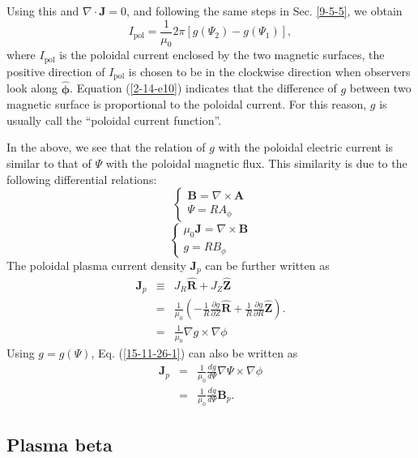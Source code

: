 \documentclass{llncs}
\newcommand{\tmmathbf}[1]{\ensuremath{\boldsymbol{#1}}}
\newcommand{\tmop}[1]{\ensuremath{\operatorname{#1}}}
\begin{document}
Using this and $\nabla \cdot \mathbf{J}= 0$, and following the same steps in
Sec. \ref{9-5-5}, we obtain
\begin{equation}
  \label{2-14-e10} I_{\tmop{pol}} = \frac{1}{\mu_0} 2 \pi [g (\Psi_2) - g
  (\Psi_1)],
\end{equation}
where $I_{\tmop{pol}}$ is the poloidal current enclosed by the two magnetic
surfaces, the positive direction of $I_{\tmop{pol}}$ is chosen to be in the
clockwise direction when observers look along $\hat{\tmmathbf{\phi}}$.
Equation (\ref{2-14-e10}) indicates that the difference of $g$ between two
magnetic surface is proportional to the poloidal current. For this reason, $g$
is usually call the ``poloidal current function''.

In the above, we see that the relation of $g$ with the poloidal electric
current is similar to that of $\Psi$ with the poloidal magnetic flux. This
similarity is due to the following differential relations:
\[ \left\{ \begin{array}{l}
     \mathbf{B}= \nabla \times \mathbf{A}\\
     \Psi = R A_{\phi}
   \end{array} \right. \]
\[ \left\{ \begin{array}{l}
     \mu_0 \mathbf{J}= \nabla \times \mathbf{B}\\
     g = R B_{\phi}
   \end{array} \right. \]
The poloidal plasma current density $\mathbf{J}_p$ can be further written as
\begin{eqnarray}
  \mathbf{J}_p & \equiv & J_R \hat{\mathbf{R}} + J_Z \hat{\mathbf{Z}}
  \nonumber\\
  & = & \frac{1}{\mu_0} \left( - \frac{1}{R}  \frac{\partial g}{\partial Z}
  \hat{\mathbf{R}} + \frac{1}{R} \frac{\partial g}{\partial R}
  \hat{\mathbf{Z}} \right) . \nonumber\\
  & = & \frac{1}{\mu_0} \nabla g \times \nabla \phi  \label{15-11-26-1}
\end{eqnarray}
Using $g = g (\Psi)$, Eq. (\ref{15-11-26-1}) can also be written as
\begin{eqnarray}
  \mathbf{J}_p & = & \frac{1}{\mu_0}  \frac{d g}{d \Psi} \nabla \Psi \times
  \nabla \phi \nonumber\\
  & = & \frac{1}{\mu_0}  \frac{d g}{d \Psi} \mathbf{B}_p . 
\end{eqnarray}
\subsection{Plasma beta}\label{2015-5-31-p1}
\end{document}
